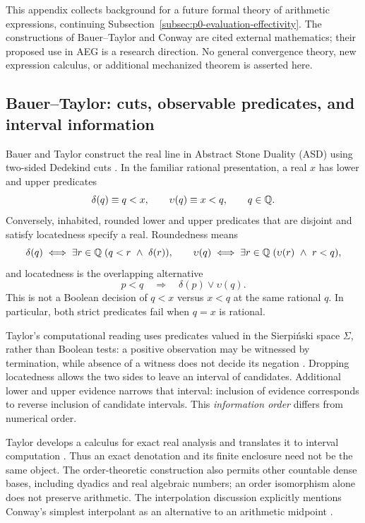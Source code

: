 This appendix collects background for a future formal theory of arithmetic
expressions, continuing Subsection~\ref{subsec:p0-evaluation-effectivity}.
The constructions of Bauer--Taylor and Conway are cited external mathematics;
their proposed use in AEG is a research direction.  No general convergence
theory, new expression calculus, or additional mechanized theorem is asserted
here.

\subsection{Bauer--Taylor: cuts, observable predicates, and interval information}
\label{subsec:p0-taylor-cuts}

Bauer and Taylor construct the real line in Abstract Stone Duality (ASD)
using two-sided Dedekind cuts \cite[Sections 2 and 6]{BauerTaylor2009Dedekind}.
In the familiar rational presentation, a real $x$ has lower and upper predicates
\[
  \delta(q)\equiv q<x,\qquad \upsilon(q)\equiv x<q,
  \qquad q\in\mathbb{Q}.
\]
Conversely, inhabited, rounded lower and upper predicates that are disjoint
and satisfy locatedness specify a real.  Roundedness means
\[
 \delta(q)\iff\exists r\in\mathbb{Q}\;(q<r\ \land\ \delta(r)),\qquad
 \upsilon(q)\iff\exists r\in\mathbb{Q}\;(\upsilon(r)\ \land\ r<q),
\]
and locatedness is the overlapping alternative
\[
  p<q\quad\Longrightarrow\quad\delta(p)\lor\upsilon(q).
\]
This is not a Boolean decision of $q<x$ versus $x<q$ at the same rational $q$.
In particular, both strict predicates fail when $q=x$ is rational.

Taylor's computational reading uses predicates valued in the Sierpi\'nski
space $\Sigma$, rather than Boolean tests: a positive observation may be
witnessed by termination, while absence of a witness does not decide its
negation \cite[Section 2]{Taylor2006IntervalWithoutIntervals}.
Dropping locatedness allows the two sides to leave an interval of candidates.
Additional lower and upper evidence narrows that interval: inclusion of
evidence corresponds to reverse inclusion of candidate intervals.  This
\emph{information order} differs from numerical order.

Taylor develops a calculus for exact real analysis and translates it to
interval computation \cite[Sections 5--6]{Taylor2006IntervalWithoutIntervals}.
Thus an exact denotation and its finite enclosure need not be the same object.
The order-theoretic construction also permits other countable dense bases,
including dyadics and real algebraic numbers; an order isomorphism alone does
not preserve arithmetic.  The interpolation discussion explicitly mentions
Conway's simplest interpolant as an alternative to an arithmetic midpoint
\cite[Section 6]{BauerTaylor2009Dedekind}.

